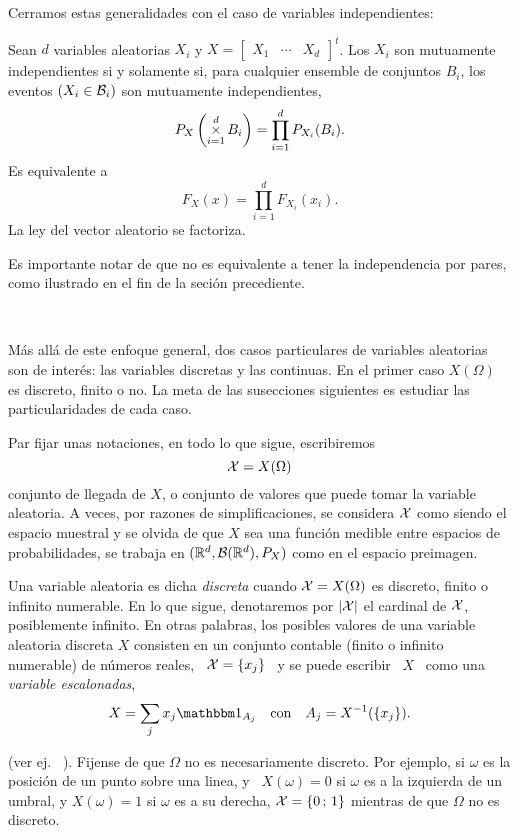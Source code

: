 Cerramos estas generalidades con el caso de variables independientes:
%
\begin{definicion}[Independencia]
  Sean $d$  variables aleatorias  $X_i$ y  $X = \begin{bmatrix}  X_1 &  \cdots &
    X_d  \end{bmatrix}^t$.   Los  $X_i$   son  mutuamente  independientes  si  y
  solamente si,  para cualquier ensemble  de conjuntos $B_i$, los  eventos $(X_i
  \in \mathcal{B}_i)$ son mutuamente independientes, \ie
  \[
  P_X\left( \operatorname*{\times}_{i=1}^d B_i \right) = \prod_{i=1}^d P_{X_i}(B_i).
  \]
  Es equivalente a
  \[
  F_X(x) = \prod_{i=1}^d F_{X_i}(x_i).
  \]
  La  ley  del  vector  aleatorio  se factoriza.  
\end{definicion}
%
\noindent Es importante notar de que  no es equivalente a tener la independencia
por pares, como ilustrado en el fin de la seci\'on precediente.

\

M\'as  all\'a de  este  enfoque  general, dos  casos  particulares de  variables
aleatorias son  de inter\'es:  las variables discretas  y las continuas.   En el
primer caso  $X(\Omega)$ es discreto, finito  o no.  La meta  de las susecciones
siguientes es estudiar las particularidades de cada caso.

Par fijar unas notaciones, en todo lo que sigue, escribiremos
%
\[
\mathcal{X} = X(\Omega)
\]
%
conjunto de  llegada de $X$, o conjunto  de valores que puede  tomar la variable
aleatoria.  A  veces, por  razones de simplificaciones,  se considera  $\mathcal{X}$ como
siendo el  espacio muestral  y se olvida  de que  $X$ sea una  funci\'on medible
entre espacios de probabilidades,  \ie se trabaja en $(\mathbb{R}^d,\mathcal{B}(\mathbb{R}^d),P_X)$
como en el espacio preimagen.




\label{Ssec:MP:VADiscreta}

\begin{definicion}
  Una  variable aleatoria es  dicha {\it  discreta} cuando  $\mathcal{X} =  X(\Omega)$ es
  discreto,  finito o  infinito numerable.   En  lo que  sigue, denotaremos  por
  $|\mathcal{X}|$  el cardinal  de $\mathcal{X}$,  posiblemente infinito.  En otras  palabras, los
  posibles  valores de  una  variable  aleatoria discreta  $X$  consisten en  un
  conjunto contable (finito  o infinito numerable) de n\'umeros  reales, \ $\mathcal{X} =
  \{ x_j \}$ \ y se puede escribir \ $X$ \ como una {\it variable escalonadas},
  \[
  X = \sum_j x_j \un_{A_j} \quad \mbox{con} \quad A_j = X^{-1}(\{ x_j \}).
  \]
\end{definicion}
%
\noindent (ver ej.  ~\cite{AthLah06, HogMck13}).  Fijense de que  $\Omega$ no es
necesariamente discreto.  Por ejemplo, si  $\omega$ es la posici\'on de un punto
sobre una linea, y \ $X(\omega) = 0$ si $\omega$ es a la izquierda de un umbral, y
$X(\omega) = 1$ si $\omega$  es a su derecha, $\mathcal{X} = \{ 0 \,  ; \, 1 \}$ mientras
de que $\Omega$ no es discreto.

